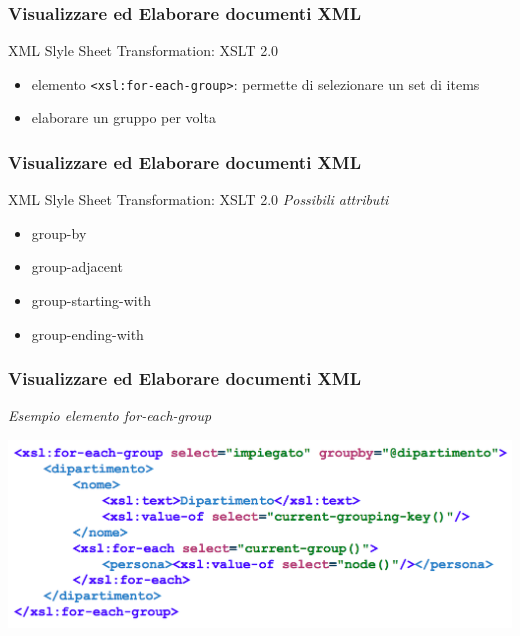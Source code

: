 \begin{frame}
    \frametitle{Visualizzare ed Elaborare documenti XML}
    \addtocounter{nframe}{1}
    

     \begin{block}{XML Slyle Sheet Transformation: XSLT 2.0}
        \begin{itemize}
            \item elemento \texttt{<xsl:for-each-group>}: permette di selezionare un set di items
            \item elaborare un gruppo per volta
        \end{itemize}
        
     \end{block}

\end{frame}

\begin{frame}
    \frametitle{Visualizzare ed Elaborare documenti XML}
    \addtocounter{nframe}{1}
    
     \begin{block}{XML Slyle Sheet Transformation: XSLT 2.0}
        \textit{Possibili attributi}
        \begin{itemize}
            \item group-by
            \item group-adjacent
            \item group-starting-with
            \item group-ending-with
        \end{itemize}
    
    \end{block}

\end{frame}

\begin{frame}
    \frametitle{Visualizzare ed Elaborare documenti XML}
    \addtocounter{nframe}{1}
    
        \textit{Esempio elemento for-each-group}

    \begin{center}
        \includegraphics[width=.95\textwidth]{imgs/esempio-groupBy.png}
    \end{center}

\end{frame}

